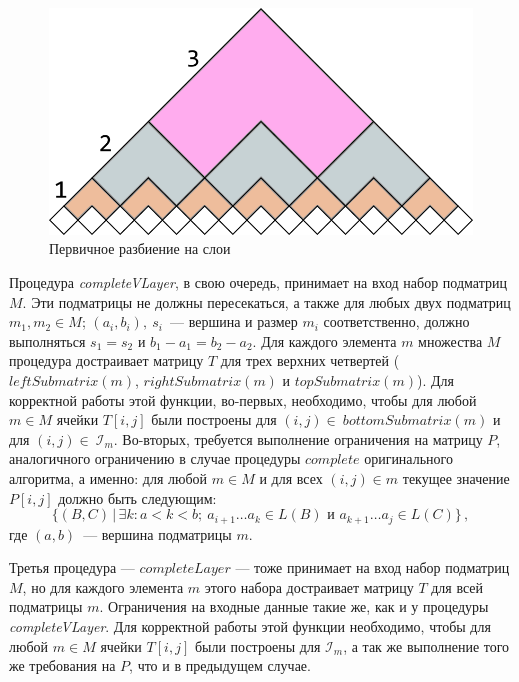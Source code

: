 \documentclass[a4paper,12pt]{article}  %
\theoremstyle{definition}
\theoremstyle{remark}
\begin{document}
\begin{figure}[!ht]
  \centering
    \includegraphics[width=0.9\linewidth]{layers.png}
  \caption{Первичное разбиение на слои}
  \label{gr:layers}
\end{figure}

Процедура \textit{completeVLayer}, в свою очередь, принимает на вход набор подматриц $M$. Эти подматрицы не должны пересекаться, а также для любых двух подматриц $m_1, m_2 \in M$; $(a_i,b_i),\ s_i$~--- вершина и размер $m_i$ соответственно, должно выполняться $s_1 = s_2$ и $b_1 - a_1 = b_2 - a_2$. Для каждого элемента $m$ множества $M$ процедура достраивает матрицу $T$ для трех верхних четвертей ($leftSubmatrix(m)$, $rightSubmatrix(m)$ и $topSubmatrix(m)$). Для корректной работы этой функции, во-первых, необходимо, чтобы для любой $m \in M$ ячейки $T[i,j]$ были построены  для $(i,j) \in\ bottomSubmatrix(m)$ и для $(i,j) \in\ \mathcal{I}_m$. Во-вторых, требуется выполнение ограничения на матрицу $P$, аналогичного ограничению в случае процедуры $complete$ оригинального алгоритма, а именно: для любой $m \in M$ и для всех $(i,j) \in m$ текущее значение $P[i,j]$ должно быть следующим:
$$\{(B,C)\,|\,\exists k: a < k < b;\ a_{i+1}\dots a_k \in L(B) \mbox{ и } a_{k+1}\dots a_j \in L(C)\}\,,$$
где $(a,b)$~--- вершина подматрицы $m$.

Третья процедура --- $completeLayer$ --- тоже принимает на вход набор подматриц $M$, но для каждого элемента $m$ этого набора достраивает матрицу $T$ для всей подматрицы $m$. Ограничения на входные данные такие же, как и у процедуры \textit{completeVLayer}. Для корректной работы этой функции необходимо, чтобы для любой $m \in M$ ячейки $T[i,j]$ были построены для $\mathcal{I}_m$, а так же выполнение того же требования на $P$, что и в предыдущем случае. 
\end{document}
